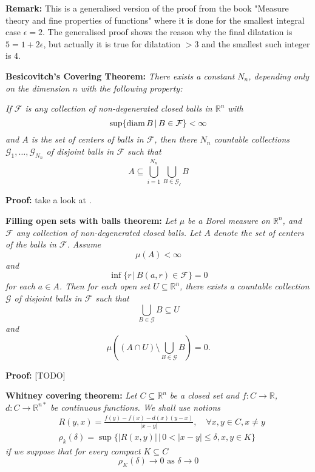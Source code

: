 \documentclass{article}
\begin{document}
\vspace{1ex}
\textbf{Remark:} This is a generalised version of the proof from the book
"Measure theory and fine properties of functions" where it is done for the
smallest integral case $\epsilon = 2$. The generalised proof shows the reason
why the final dilatation is $5 = 1+2\epsilon$, but actually it is true for
dilatation $>3$ and the smallest such integer is 4.


\vspace{2ex}
\textbf{Besicovitch’s Covering Theorem:} \textit{There exists a constant $N_n$, depending
only on the dimension $n$ with the following property:}

\vspace{1ex} \textit{
If $\mathcal{F}$ is any collection of non-degenerated closed balls in
$\mathbb{R}^n$ with
\[\sup\{\textnormal{diam}\,B\,|\,B\in\mathcal F\}<\infty\]
and $A$ is the set of centers of balls in $\mathcal F$, then there $N_n$
countable collections $\mathcal{G}_1,\ldots,\mathcal{G}_{N_n}$ of disjoint
balls in $\mathcal{F}$ such that
\[A\subseteq\bigcup_{i=1}^{N_n}\bigcup_{B\in\mathcal{G_i}}B\]}

\vspace{1ex}
\textbf{Proof:} take a look at \cite{evans_gariepy}.

\vspace{2ex}
\textbf{Filling open sets with balls theorem:} \textit{Let $\mu$ be a Borel measure on
$\mathbb{R}^n$, and $\mathcal{F}$ any collection of non-degenerated closed balls.
Let $A$ denote the set of centers of the balls in $\mathcal F$. Assume
\[\mu(A)<\infty\]
and
\[\inf\{r\,|\,B(a,r)\in\mathcal F\}=0\]
for each $a\in A$. Then for each open set $U\subseteq\mathbb{R}^n$, there
exists a countable collection $\mathcal G$ of disjoint balls in $\mathcal F$ such that
\[\bigcup_{B\in\mathcal G} B\subseteq U\]
and
\[\mu\left((A\cap U)\setminus\bigcup_{B\in\mathcal G}B\right)=0.\]}

\vspace{1ex}
\textbf{Proof:} [TODO]

\vspace{2ex}
\textbf{Whitney covering theorem:}\textit{
Let $C\subseteq \mathbb{R}^n$ be a closed set and $f:C\rightarrow\mathbb R$,
$d:C\rightarrow\mathbb{R}^{n*}$ be continuous functions. We shall use notions}
\begin{align*}
    &R(y,x)=\frac{f(y)-f(x)-d(x)(y-x)}{|x-y|},\quad\forall x,y\in C, x\neq y \\
    &\rho_k(\delta)=\sup\{|R(x,y)|\, |\, 0<|x-y|\leq\delta, x, y\in K\}
\end{align*}
\textit{if we suppose that for every compact $K\subseteq C$}
\begin{equation}
\rho_K(\delta)\rightarrow 0\text{ as }\delta\rightarrow 0
\end{equation}
\end{document}
